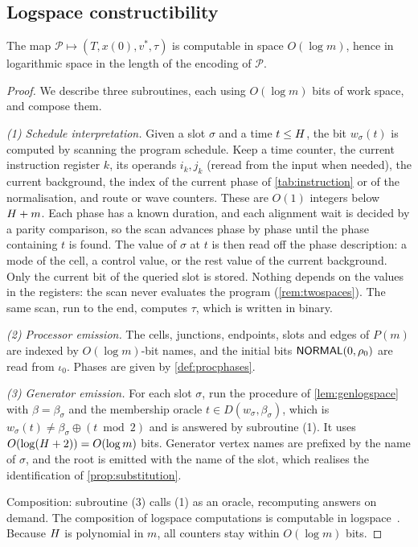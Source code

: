 \subsection{Logspace constructibility}

\begin{proposition}\label{prop:logspace}
The map $\mathcal P\mapsto(T,x(0),v^\ast,\tau)$ is computable in space $O(\log m)$, hence in
logarithmic space in the length of the encoding of $\mathcal P$.
\end{proposition}

\begin{proof}
We describe three subroutines, each using $O(\log m)$ bits of work space, and compose them.

\emph{(1) Schedule interpretation.} Given a slot $\sigma$ and a time $t\le H$, the bit
$w_\sigma(t)$ is computed by scanning the program schedule. Keep a time counter, the current
instruction register $k$, its operands $i_k,j_k$ (reread from the input when needed), the current
background, the index of the current phase of \cref{tab:instruction} or of the normalisation, and
route or wave counters. These are $O(1)$ integers below $H+m$. Each phase has a known duration,
and each alignment wait is decided by a parity comparison, so the scan advances phase by phase until
the phase containing $t$ is found. The value of $\sigma$ at $t$ is then read off the phase
description: a mode of the cell, a control value, or the rest value of the current background. Only
the current bit of the queried slot is stored. Nothing depends on the values in the registers: the
scan never evaluates the program (\cref{rem:twospaces}). The same scan, run to the end, computes
$\tau$, which is written in binary.

\emph{(2) Processor emission.} The cells, junctions, endpoints, slots and edges of $P(m)$ are
indexed by $O(\log m)$-bit names, and the initial bits $\textsf{NORMAL}(0,\rho_0)$ are read from $\iota_0$.
Phases are given by \cref{def:procphases}.

\emph{(3) Generator emission.} For each slot $\sigma$, run the procedure of \cref{lem:genlogspace} with
$\beta=\beta_\sigma$ and the membership oracle $t\in D(w_\sigma,\beta_\sigma)$, which is
$w_\sigma(t)\ne\beta_\sigma\oplus(t\bmod2)$ and is answered by subroutine (1). It uses
$O(\log(H+2))=O(\log m)$ bits. Generator vertex names are prefixed by the name of $\sigma$, and the
root is emitted with the name of the slot, which realises the identification of
\cref{prop:substitution}.

Composition: subroutine (3) calls (1) as an oracle, recomputing answers on demand. The composition of
logspace computations is computable in logspace~\cite{Jon75,LL76}. Because $H$ is polynomial in
$m$, all counters stay within $O(\log m)$ bits.
\end{proof}

